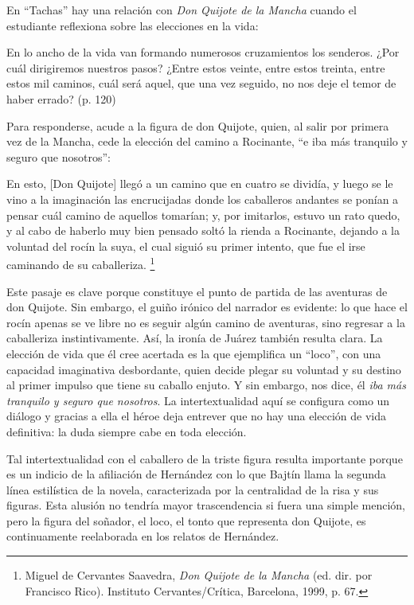 \documentclass[14pt,twoside,final]{extbook} %
\let\oldfootnote\footnote
\renewcommand\footnote[1]{%
\oldfootnote{\hspace{1mm}#1}}
\begin{document}
En ``Tachas'' hay una relación con \emph{Don Quijote de la Mancha} cuando el estudiante reflexiona sobre las elecciones en la vida:
\begin{quoting}
En lo ancho de la vida van formando numerosos cruzamientos los senderos. ¿Por cuál dirigiremos nuestros pasos? ¿Entre estos veinte, entre estos treinta, entre estos mil caminos, cuál será aquel, que una vez seguido, no nos deje el temor de haber errado? (p. 120)
\end{quoting}
Para responderse, acude a la figura de don Quijote, quien, al salir por primera vez de la Mancha, cede la elección del camino a Rocinante, ``e iba más tranquilo y seguro que nosotros'':
\begin{quoting}
En esto, [Don Quijote] llegó a un camino que en cuatro se dividía, y luego se le vino a la imaginación las encrucijadas donde los caballeros andantes se ponían a pensar cuál camino de aquellos
tomarían; y, por imitarlos, estuvo un rato quedo, y al cabo de haberlo muy bien pensado soltó la rienda a Rocinante, dejando a la voluntad del rocín la suya, el cual siguió su primer intento, que fue el irse caminando de su caballeriza.\footnote{Miguel de Cervantes Saavedra, \emph{Don Quijote de la Mancha} (ed. dir. por Francisco Rico). Instituto Cervantes/Crítica, Barcelona, 1999, p. 67.}
\end{quoting}
Este pasaje es clave porque constituye el punto de partida de las aventuras de don Quijote. Sin embargo, el guiño irónico del narrador es evidente: lo que hace el rocín apenas se ve libre no es seguir algún camino de aventuras, sino regresar a la caballeriza instintivamente. Así, la ironía de Juárez también resulta clara. La elección de vida que él cree acertada es la que ejemplifica un ``loco'', con una capacidad imaginativa desbordante, quien decide plegar su voluntad y su destino al primer impulso que tiene su caballo enjuto. Y sin embargo, nos dice, él \emph{iba más tranquilo y seguro que nosotros}. La intertextualidad aquí se configura como un diálogo y gracias a ella el héroe deja entrever que
no hay una elección de vida definitiva: la duda siempre cabe en toda elección.

Tal intertextualidad con el caballero de la triste figura resulta importante porque es un indicio de la afiliación de Hernández con lo que Bajtín llama la segunda línea estilística de la novela, caracterizada por la centralidad de la risa y sus figuras. Esta alusión no tendría mayor trascendencia si fuera una simple mención, pero la figura del soñador, el loco, el tonto que representa don Quijote, es continuamente reelaborada en los relatos de Hernández.
\end{document}
